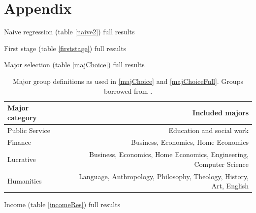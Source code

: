 \documentclass{article}
\newcommand{\regs}{../Analysis/Regressions/Output/}
\begin{document}
	\clearpage 
	\appendix
	\section*{Appendix}
	\begin{table}
		\centering
		\caption{Naive regression (table \ref{naive2}) full results}
		
		\label{naivefull}
	\end{table}

	\begin{table}
		\centering
		\scriptsize
		\caption{First stage (table \ref{firststage}) full results}
		
		\label{firststagefull}
	\end{table}

	\begin{table}
		\centering
		\scriptsize
		\caption{Major selection (table \ref{majChoice}) full results}
		
		\label{majChoiceFull}
	\end{table}

	\begin{table}
		\centering
		\caption{Major group definitions as used in \ref{majChoice} and \ref{majChoiceFull}. Groups borrowed from \textcite{rothstein2011}.}
		\begin{tabular}{lr}
			\toprule
			Major category & Included majors \\
			\midrule 
			Public Service & Education and social work \\
			Finance & Business, Economics, Home Economics \\
			Lucrative & Business, Economics, Home Economics, Engineering, Computer Science \\
			Humanities & Language, Anthropology, Philosophy, Theology, History, Art, English \\ \bottomrule
		\end{tabular}
		\label{majGroups}
	\end{table}

	\begin{table}
		\centering
		\scriptsize
		\caption{Income (table \ref{incomeRes}) full results}
		
	\end{table}

	\clearpage
	
	\printbibliography
	
\end{document}
